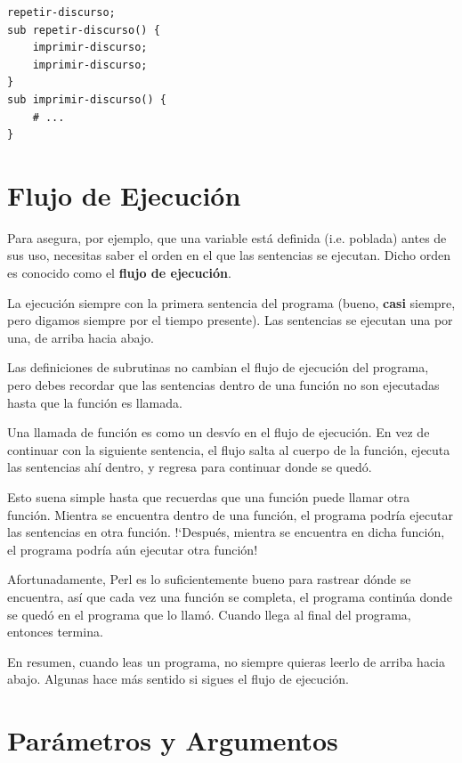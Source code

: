 \begin{lstlisting}
repetir-discurso;
sub repetir-discurso() {
    imprimir-discurso;
    imprimir-discurso;
}
sub imprimir-discurso() {
    # ...
}
\end{lstlisting}


\section{Flujo de Ejecución}

Para asegura, por ejemplo, que una variable está definida (i.e. poblada)
antes de sus uso, necesitas saber el orden en el que las sentencias se
ejecutan. Dicho orden es conocido como el {\bf flujo de ejecución}.

La ejecución siempre con la primera sentencia del programa (bueno, {\bf casi}
siempre, pero digamos siempre por el tiempo presente). Las sentencias se
ejecutan una por una, de arriba hacia abajo.

Las definiciones de subrutinas no cambian el flujo de ejecución del 
programa, pero debes recordar que las sentencias dentro de una función
no son ejecutadas hasta que la función es llamada.

Una llamada de función es como un desvío en el flujo de ejecución. En vez
de continuar con la siguiente sentencia, el flujo salta al cuerpo de la función,
ejecuta las sentencias ahí dentro, y regresa para continuar donde se
quedó.

Esto suena simple hasta que recuerdas que una función puede llamar otra función.
Mientra se encuentra dentro de una función, el programa podría ejecutar las
sentencias en otra función. !`Después, mientra se encuentra en dicha función,
el programa podría aún ejecutar otra función!

Afortunadamente, Perl es lo suficientemente bueno para rastrear dónde 
se encuentra, así que cada vez una función se completa, el programa continúa 
donde se quedó en el programa que lo llamó. Cuando llega al final del programa,
entonces termina.

En resumen, cuando leas un programa, no siempre quieras leerlo de 
arriba hacia abajo. Algunas hace más sentido si sigues el flujo de
ejecución.

\section{Parámetros y Argumentos}
\label{parameters}

